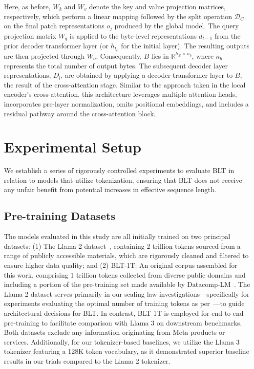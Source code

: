 Here, as before, $W_k$ and $W_v$ denote the key and value projection matrices, respectively, which perform a linear mapping followed by the split operation $\mathcal{D}_C$ on the final patch representations $o_j$ produced by the global model. The query projection matrix $W_q$ is applied to the byte-level representations $d_{l-1}$ from the prior decoder transformer layer (or $h_{l_{\mathcal{E}}}$ for the initial layer). The resulting outputs are then projected through $W_o$. Consequently, $B$ lies in $\mathbb{R}^{h_{\mathcal{D}} \times n_b}$, where $n_b$ represents the total number of output bytes. The subsequent decoder layer representations, $D_l$, are obtained by applying a decoder transformer layer to $B$, the result of the cross-attention stage. Similar to the approach taken in the local encoder’s cross-attention, this architecture leverages multiple attention heads, incorporates pre-layer normalization, omits positional embeddings, and includes a residual pathway around the cross-attention block.

\section{Experimental Setup}
\label{section:experiments}
We establish a series of rigorously controlled experiments to evaluate {\textsc BLT} in relation to models that utilize tokenization, ensuring that {\textsc BLT} does not receive any unfair benefit from potential increases in effective sequence length.

\subsection{Pre-training Datasets} The models evaluated in this study are all initially trained on two principal datasets: (1) The Llama 2 dataset~\citep{touvron2023llama}, containing 2 trillion tokens sourced from a range of publicly accessible materials, which are rigorously cleaned and filtered to ensure higher data quality; and (2) {\textsc BLT}-1T: An original corpus assembled for this work, comprising 1 trillion tokens collected from diverse public domains and including a portion of the pre-training set made available by Datacomp-LM~\citep{li2024datacomp}. The Llama 2 dataset serves primarily in our scaling law investigations—specifically for experiments evaluating the optimal number of training tokens as per~\cite{dubey2024llama}—to guide architectural decisions for {\textsc BLT}. In contrast, {\textsc BLT}-1T is employed for end-to-end pre-training to facilitate comparison with Llama 3 on downstream benchmarks. Both datasets exclude any information originating from Meta products or services. Additionally, for our tokenizer-based baselines, we utilize the Llama 3 tokenizer featuring a 128K token vocabulary, as it demonstrated superior baseline results in our trials compared to the Llama 2 tokenizer.

